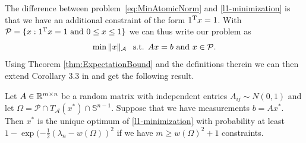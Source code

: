 \documentclass{article} %
\begin{document}
The difference between problem~\eqref{eq:MinAtomicNorm} and \eqref{l1-minimization} is that we have an additional constraint of the form $1^{\rm T} x = 1$.
With $\mathcal P = \{ x: 1^{\rm T} x = 1 \text{ and }0\leq x\leq 1\}$ we can thus write our problem as
\begin{equation}
\label{eq:MinAtomicNorm_ProbSimplex}
\min \|x\|_{\mathcal{A}} \:\: \text{ s.t. } Ax = b \text{ and } x\in \mathcal P.
\end{equation} 
Using Theorem \ref{thm:ExpectationBound} and the definitions therein we can then extend Corollary 3.3 in \cite{inverse_problems} and get the following result.
\begin{theorem}
\label{thm:UniqueRecovery}
  Let $A\in \mathbb{R}^{m\times n}$ be a random matrix with independent
  entries $A_{ij}\sim N(0, 1)$ and let $\Omega = \mathcal P \cap T_{\mathcal
    A}(x^*)\cap \mathbb{S}^{n-1}$. Suppose that we have
  measurements $b = Ax^*$. Then $x^*$ is the unique optimum of
  \eqref{l1-minimization} with probability at least $1 - \exp(-\frac 1
  2 (\lambda_n - w(\Omega))^2$ if we have $m\geq w(\Omega)^2 + 1$
  constraints.
\end{theorem}
\end{document}
